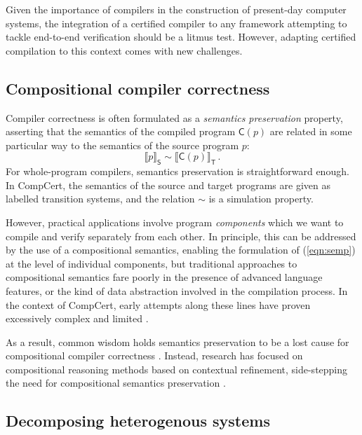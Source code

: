 \documentclass[sigplan,10pt,review]{acmart}
\newcommand{\kw}[1]{\ensuremath{ \mathsf{#1} }}
\begin{document}
Given the importance of compilers in
the construction of present-day computer systems,
the integration of a certified compiler to any framework
attempting to tackle end-to-end verification
should be a litmus test.
However, adapting certified compilation to this context
comes with new challenges.


\subsection{Compositional compiler correctness} %

Compiler correctness is often formulated as a
\emph{semantics preservation} property,
asserting that the semantics
of the compiled program $\kw{C}(p)$
are related in some particular way
to the semantics
of the source program $p$:
\begin{equation} \label{eqn:semp}
  \llbracket p \rrbracket_\kw{S} \sim
  \llbracket \kw{C}(p) \rrbracket_\kw{T}
  \,.
\end{equation}
For whole-program compilers,
semantics preservation is straightforward enough.
In CompCert,
the semantics of the source and target programs
are given as labelled transition systems,
and the relation $\sim$ is a simulation property.

However,
practical applications involve
program \emph{components} which we want to compile
and verify separately from each other.
In principle,
this can be addressed by the use of a compositional semantics,
enabling the formulation of (\ref{eqn:semp})
at the level of individual components,
but traditional approaches to compositional semantics
fare poorly in the presence of advanced language features,
or the kind of data abstraction
involved in the compilation process.
In the context of CompCert,
early attempts along these lines
have proven excessively
complex and limited \cite{cpp15,compcompcert}.

As a result,
common wisdom holds semantics preservation
to be a lost cause
for compositional compiler correctness \cite{next700}.
Instead,
research has focused on
compositional reasoning methods
based on contextual refinement,
side-stepping the need for compositional semantics preservation
\cite{sepcompcert,compcertm}.


\subsection{Decomposing heterogenous systems} %
\end{document}
